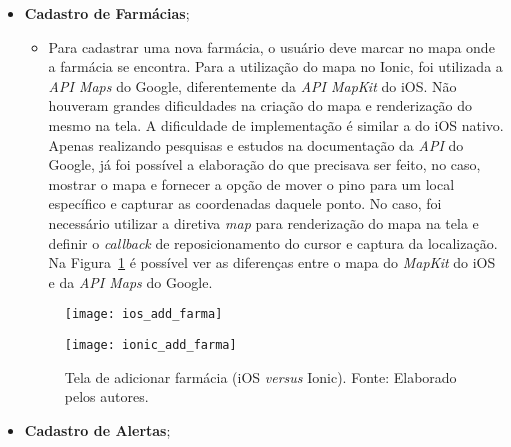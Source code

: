 \begin{itemize}
\begin{itemize}
		 \end{itemize}
     \item \textbf{Cadastro de Farmácias}; 	
	 \begin{itemize}
		\item Para cadastrar uma nova farmácia, o usuário deve marcar no mapa onde a farmácia se encontra. Para a utilização do mapa no Ionic, foi utilizada a \textit{API Maps} do Google, diferentemente da 
		\textit{API MapKit} do iOS. Não houveram grandes dificuldades na criação do mapa e renderização do mesmo na tela. A dificuldade de implementação é similar a do iOS nativo.
		Apenas realizando pesquisas e estudos na documentação da \textit{API} do Google, 
		já foi possível a elaboração do que precisava ser feito, no caso, mostrar o mapa e fornecer a opção de mover o pino para um local específico e capturar as coordenadas daquele ponto. No caso, foi 
		necessário utilizar a diretiva \textit{map} para renderização do mapa na tela e definir o \textit{callback} de reposicionamento do cursor e captura da localização. Na Figura~\ref{fig:add_farma} é possível 
		ver as diferenças entre o mapa do \textit{MapKit} do iOS e da \textit{API Maps} do Google.
	 \end{itemize}
	 \begin{figure}[H]
		\centering
		\begin{minipage}{.5\textwidth}
			\centering
			\texttt{[image: ios\_add\_farma]}
		\end{minipage}\hfill
		\begin{minipage}{.5\textwidth}
			\centering
			\texttt{[image: ionic\_add\_farma]}
		\end{minipage}
	\caption[Tela de adicionar farmácia (iOS \textit{versus} Ionic)]{ Tela de adicionar farmácia (iOS \textit{versus} Ionic). Fonte: Elaborado pelos autores.}
	\label{fig:add_farma}
	\end{figure}
 	
 	\item \textbf{Cadastro de Alertas};
 	

\end{itemize}
